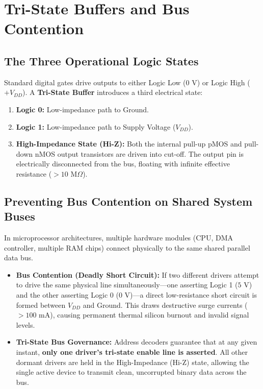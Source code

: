 \section{Tri-State Buffers and Bus Contention}
\label{sec:tristate_buffers}

\subsection{The Three Operational Logic States}
Standard digital gates drive outputs to either Logic Low ($0\text{ V}$) or Logic High ($+V_{DD}$). A \textbf{Tri-State Buffer} introduces a third electrical state:
\begin{enumerate}[label=\bfseries\arabic*.]
    \item \textbf{Logic 0:} Low-impedance path to Ground.
    \item \textbf{Logic 1:} Low-impedance path to Supply Voltage ($V_{DD}$).
    \item \textbf{High-Impedance State (Hi-Z):} Both the internal pull-up pMOS and pull-down nMOS output transistors are driven into cut-off. The output pin is electrically disconnected from the bus, floating with infinite effective resistance ($>10\text{ M}\Omega$).
\end{enumerate}

\subsection{Preventing Bus Contention on Shared System Buses}
In microprocessor architectures, multiple hardware modules (CPU, DMA controller, multiple RAM chips) connect physically to the same shared parallel data bus.
\begin{itemize}
    \item \textbf{Bus Contention (Deadly Short Circuit):} If two different drivers attempt to drive the same physical line simultaneously—one asserting Logic 1 ($5\text{ V}$) and the other asserting Logic 0 ($0\text{ V}$)—a direct low-resistance short circuit is formed between $V_{DD}$ and Ground. This draws destructive surge currents ($>100\text{ mA}$), causing permanent thermal silicon burnout and invalid signal levels.
    \item \textbf{Tri-State Bus Governance:} Address decoders guarantee that at any given instant, \textbf{only one driver's tri-state enable line is asserted}. All other dormant drivers are held in the High-Impedance (Hi-Z) state, allowing the single active device to transmit clean, uncorrupted binary data across the bus.
\end{itemize}



